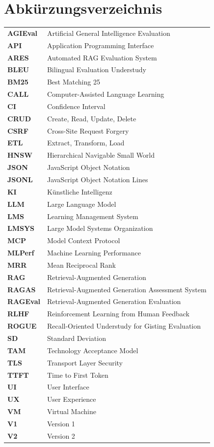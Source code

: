 \chapter{Abkürzungsverzeichnis}

\begin{longtable}{>{\bfseries}l p{\dimexpr\textwidth-4cm\relax}}
AGIEval & Artificial General Intelligence Evaluation \\[4pt]
API & Application Programming Interface \\[4pt]
ARES & Automated RAG Evaluation System \\[4pt]
BLEU & Bilingual Evaluation Understudy \\[4pt]
BM25 & Best Matching 25 \\[4pt]
CALL & Computer-Assisted Language Learning \\[4pt]
CI & Confidence Interval \\[4pt]
CRUD & Create, Read, Update, Delete \\[4pt]
CSRF & Cross-Site Request Forgery \\[4pt]
ETL & Extract, Transform, Load \\[4pt]
HNSW & Hierarchical Navigable Small World \\[4pt]
JSON & JavaScript Object Notation \\[4pt]
JSONL & JavaScript Object Notation Lines \\[4pt]
KI & Künstliche Intelligenz \\[4pt]
LLM & Large Language Model \\[4pt]
LMS & Learning Management System \\[4pt]
LMSYS & Large Model Systems Organization \\[4pt]
MCP & Model Context Protocol \\[4pt]
MLPerf & Machine Learning Performance \\[4pt]
MRR & Mean Reciprocal Rank \\[4pt]
RAG & Retrieval-Augmented Generation \\[4pt]
RAGAS & Retrieval-Augmented Generation Assessment System \\[4pt]
RAGEval & Retrieval-Augmented Generation Evaluation \\[4pt]
RLHF & Reinforcement Learning from Human Feedback \\[4pt]
ROGUE & Recall-Oriented Understudy for Gisting Evaluation \\[4pt]
SD & Standard Deviation \\[4pt]
TAM & Technology Acceptance Model \\[4pt]
TLS & Transport Layer Security \\[4pt]
TTFT & Time to First Token \\[4pt]
UI & User Interface \\[4pt]
UX & User Experience \\[4pt]
VM & Virtual Machine \\[4pt]
V1 & Version 1 \\[4pt]
V2 & Version 2 \\[4pt]
\end{longtable}